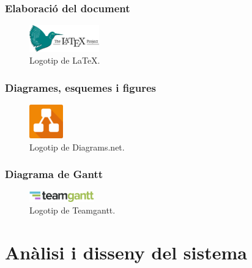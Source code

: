 \documentclass[a4paper,12pt]{ThesisStyle}
\begin{document}
\subsection{Elaboració del document}
\label{subsec:decisions_memoria_document}



\begin{figure}[H]
  \centering
  \includegraphics[width=0.27\textwidth]{assets/logos/LaTeX.png}
  \caption{\label{img:logo_latex}Logotip de LaTeX.}
\end{figure}

\subsection{Diagrames, esquemes i figures}
\label{subsec:decisions_memoria_figures}



\begin{figure}[H]
  \centering
  \includegraphics[width=0.13\textwidth]{assets/logos/diagramsNet.png}
  \caption{\label{img:logo_diagrams}Logotip de Diagrams.net.}
\end{figure}

\subsection{Diagrama de Gantt}
\label{subsec:decisions_memoria_gantt}



\begin{figure}[H]
  \centering
  \includegraphics[width=0.25\textwidth]{assets/logos/teamGantt.png}
  \caption{\label{img:logo_teamGantt}Logotip de Teamgantt.}
\end{figure}


\chapter{Anàlisi i disseny del sistema}
\label{cap:analisi}
\end{document}
